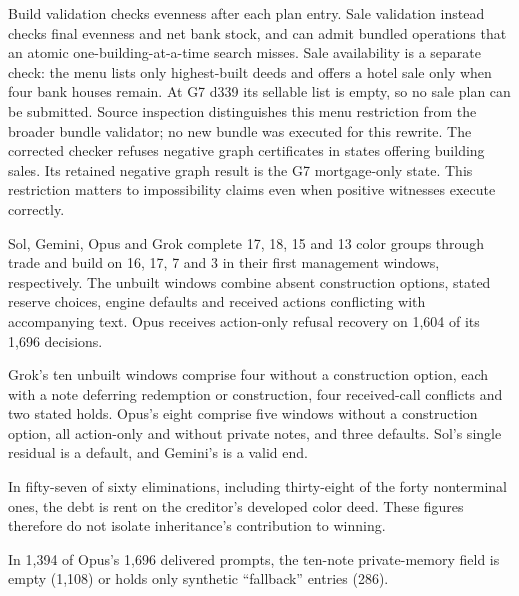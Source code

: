 Build validation checks evenness after each plan entry. Sale validation instead checks final evenness and net bank stock, and can admit bundled operations that an atomic one-building-at-a-time search misses. Sale availability is a separate check: the menu lists only highest-built deeds and offers a hotel sale only when four bank houses remain. At G7 d339 its sellable list is empty, so no sale plan can be submitted. Source inspection distinguishes this menu restriction from the broader bundle validator; no new bundle was executed for this rewrite. The corrected checker refuses negative graph certificates in states offering building sales. Its retained negative graph result is the G7 mortgage-only state. This restriction matters to impossibility claims even when positive witnesses execute correctly.

Sol, Gemini, Opus and Grok complete 17, 18, 15 and 13 color groups through trade and build on 16, 17, 7 and 3 in their first management windows, respectively. The unbuilt windows combine absent construction options, stated reserve choices, engine defaults and received actions conflicting with accompanying text. Opus receives action-only refusal recovery on 1,604 of its 1,696 decisions.

Grok's ten unbuilt windows comprise four without a construction option, each with a note deferring redemption or construction, four received-call conflicts and two stated holds. Opus's eight comprise five windows without a construction option, all action-only and without private notes, and three defaults. Sol's single residual is a default, and Gemini's is a valid end.

In fifty-seven of sixty eliminations, including thirty-eight of the forty nonterminal ones, the debt is rent on the creditor's developed color deed. These figures therefore do not isolate inheritance's contribution to winning.

In 1,394 of Opus's 1,696 delivered prompts, the ten-note private-memory field is empty (1,108) or holds only synthetic ``fallback'' entries (286).


